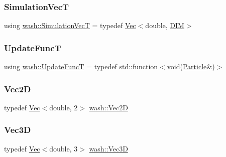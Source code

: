 \subsubsection{\texorpdfstring{Simulation\+VecT}{SimulationVecT}}
{\footnotesize\ttfamily using \mbox{\hyperlink{namespacewash_ab2cbbc37941b733095c9225b49b4cad9}{wash\+::\+Simulation\+VecT}} = typedef \mbox{\hyperlink{classwash_1_1Vec}{Vec}}$<$double, \mbox{\hyperlink{wser_8hpp_ac25189db92959bff3c6c2adf4c34b50a}{D\+IM}}$>$}

\mbox{\label{namespacewash_aaae2f0d4980b7c550d6de709b35f0b8e}} 
\subsubsection{\texorpdfstring{Update\+FuncT}{UpdateFuncT}}
{\footnotesize\ttfamily using \mbox{\hyperlink{namespacewash_aaae2f0d4980b7c550d6de709b35f0b8e}{wash\+::\+Update\+FuncT}} = typedef std\+::function$<$void(\mbox{\hyperlink{classwash_1_1Particle}{Particle}}\&)$>$}

\mbox{\label{namespacewash_a905f2d902fc7aaab0e8a58b6ee25baf1}} 
\subsubsection{\texorpdfstring{Vec2D}{Vec2D}}
{\footnotesize\ttfamily typedef \mbox{\hyperlink{classwash_1_1Vec}{Vec}}$<$double, 2$>$ \mbox{\hyperlink{namespacewash_a905f2d902fc7aaab0e8a58b6ee25baf1}{wash\+::\+Vec2D}}}

\mbox{\label{namespacewash_a57da016a0635e7d25a96165adb48c7e3}} 
\subsubsection{\texorpdfstring{Vec3D}{Vec3D}}
{\footnotesize\ttfamily typedef \mbox{\hyperlink{classwash_1_1Vec}{Vec}}$<$double, 3$>$ \mbox{\hyperlink{namespacewash_a57da016a0635e7d25a96165adb48c7e3}{wash\+::\+Vec3D}}}

\mbox{\label{namespacewash_a7de7a4195ce994df4dd54ff86e3fff20}} 
